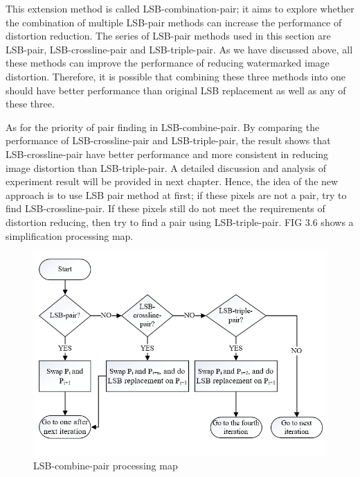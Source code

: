 This extension method is called LSB-combination-pair; it aims to explore whether the combination of multiple LSB-pair methods can increase the performance of distortion reduction. The series of LSB-pair methods used in this section are LSB-pair, LSB-crossline-pair and LSB-triple-pair. As we have discussed above, all these methods can improve the performance of reducing watermarked image distortion. Therefore, it is possible that combining these three methods into one should have better performance than original LSB replacement as well as any of these three. 

As for the priority of pair finding in LSB-combine-pair. By comparing the performance of LSB-crossline-pair and LSB-triple-pair, the result shows that LSB-crossline-pair have better performance and more consistent in reducing image distortion than LSB-triple-pair. A detailed discussion and analysis of experiment result will be provided in next chapter. Hence, the idea of the new approach is to use LSB pair method at first; if these pixels are not a pair, try to find LSB-crossline-pair. If these pixels still do not meet the requirements of distortion reducing, then try to find a pair using LSB-triple-pair. FIG 3.6 shows a simplification processing map.


\begin{figure}[h]
\includegraphics[width=\columnwidth]{image/processing_map_ultra.PNG}
\caption{LSB-combine-pair processing map}
\label{fig:figure}
\end{figure}  